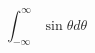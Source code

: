 \documentclass{article}
\begin{document}
\[\int^\infty_{-\infty}\sin \theta d\theta\]
\end{document}
